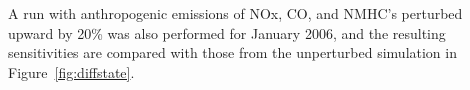 A run with anthropogenic emissions of NOx, CO, and NMHC's perturbed upward by 20\% was also performed for January 2006, and the resulting sensitivities are compared with those from the unperturbed simulation in Figure~\ref{fig:diffstate}.